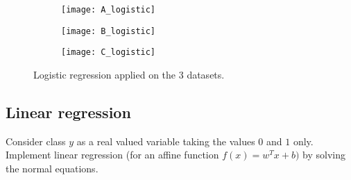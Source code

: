 \documentclass{article}
\begin{document}
\begin{figure}[h!]
    \centering
    \begin{subfigure}[b]{0.3\linewidth}
        \texttt{[image: A\_logistic]}
    \end{subfigure}
    \begin{subfigure}[b]{0.3\linewidth}
        \texttt{[image: B\_logistic]}
    \end{subfigure}
    \begin{subfigure}[b]{0.3\linewidth}
        \texttt{[image: C\_logistic]}
    \end{subfigure}
    \caption{Logistic regression applied on the 3 datasets.}
    \label{fig:logistic}
\end{figure}

\subsection{Linear regression}
Consider class $y$ as a real valued variable taking the values $0$ and $1$ only. Implement linear regression
(for an affine function $f(x)=w^Tx+b)$ by solving the normal equations.
\end{document}
